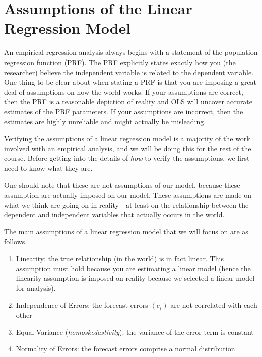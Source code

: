 \documentclass[
]{book}
\begin{document}
\section{Assumptions of the Linear Regression Model}\label{assumptions-of-the-linear-regression-model}

An empirical regression analysis always begins with a statement of the population regression function (PRF). The PRF explicitly states exactly how you (the researcher) believe the independent variable is related to the dependent variable. One thing to be clear about when stating a PRF is that you are imposing a great deal of assumptions on how the world works. If your assumptions are correct, then the PRF is a reasonable depiction of reality and OLS will uncover accurate estimates of the PRF parameters. If your assumptions are incorrect, then the estimates are highly unreliable and might actually be misleading.

Verifying the assumptions of a linear regression model is a majority of the work involved with an empirical analysis, and we will be doing this for the rest of the course. Before getting into the details of \emph{how} to verify the assumptions, we first need to know what they are.

One should note that these are not assumptions of our model, because these assumption are actually imposed on our model. These assumptions are made on what we think are going on in reality - at least on the relationship between the dependent and independent variables that actually occurs in the world.

The main assumptions of a linear regression model that we will focus on are as follows.

\begin{enumerate}
\def\labelenumi{\arabic{enumi}.}
\item
  Linearity: the true relationship (in the world) is in fact linear. This assumption must hold because you are estimating a linear model (hence the linearity assumption is imposed on reality because we selected a linear model for analysis).
\item
  Independence of Errors: the forecast errors \((e_i)\) are not correlated with each other
\item
  Equal Variance (\emph{homoskedasticity}): the variance of the error term is constant
\item
  Normality of Errors: the forecast errors comprise a normal distribution
\end{enumerate}
\end{document}
